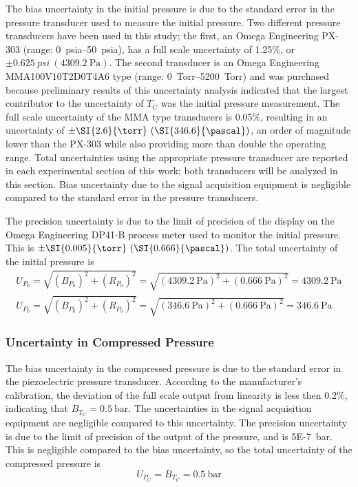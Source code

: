 \documentclass[../main.tex]{subfiles}
\begin{document}
The bias uncertainty in the initial pressure is due to the
standard error in the pressure transducer used to measure
the initial pressure. Two different pressure transducers have
been used in this study; the first, an Omega Engineering PX-303
(range: \SIrange{0}{50}{psia}), has a full scale uncertainty of 1.25\%, or
$\pm \SI{0.625}{psi} \ (\SI{4309.2}{\pascal})$. The second transducer is an
Omega Engineering MMA100V10T2D0T4A6 type (range: \SIrange{0}{5200}{Torr}) and was
purchased because preliminary results of this uncertainty analysis
indicated that the largest contributor to the uncertainty of $T_C$ was
the initial pressure measurement. The full scale uncertainty of the MMA
type transducers is 0.05\%, resulting in an uncertainty of
$\pm \SI{2.6}{\torr} \ (\SI{346.6}{\pascal})$, an order of magnitude lower than
the PX-303 while also providing more than double the operating range. Total
uncertainties using the appropriate pressure transducer are reported in
each experimental section of this work; both transducers will be analyzed
in this section. Bias uncertainty due to the signal acquisition equipment
is negligible compared to the standard error in the pressure transducers.

The precision uncertainty is due to the limit of precision of the display
on the Omega Engineering DP41-B process meter used to monitor the initial
pressure. This is $\pm\SI{0.005}{\torr} \ (\SI{0.666}{\pascal})$. The total
uncertainty of the initial pressure is
%
\begin{subequations}
\begin{align}
U_{P_0} = \sqrt{\left(B_{P_0}\right)^2 + \left(R_{P_0}\right)^2} = \sqrt{\left(\SI{4309.2}{\pascal}\right)^2 + \left(\SI{0.666}{\pascal}\right)^2} = \SI{4309.2}{\pascal} \\
U_{P_0} = \sqrt{\left(B_{P_0}\right)^2 + \left(R_{P_0}\right)^2} = \sqrt{\left(\SI{346.6}{\pascal}\right)^2 + \left(\SI{0.666}{\pascal}\right)^2} = \SI{346.6}{\pascal}
\end{align}
\end{subequations}

\subsubsection{Uncertainty in Compressed Pressure}

The bias uncertainty in the compressed pressure is due to the standard
error in the piezoelectric pressure transducer. According to the
manufacturer's calibration, the deviation of the full scale output from
linearity is less then 0.2\%, indicating that $B_{T_C}=\SI{0.5}{\bar}$.
The uncertainties in the signal acquisition equipment are negligible
compared to this uncertainty. The precision uncertainty is due to the limit
of precision of the output of the pressure, and is \SI{5E-7}{\bar}. This
is negligible compared to the bias uncertainty, so the total uncertainty
of the compressed pressure is
%
\begin{equation}
U_{P_C} = B_{T_C} = \SI{0.5}{\bar}
\end{equation}
\end{document}
